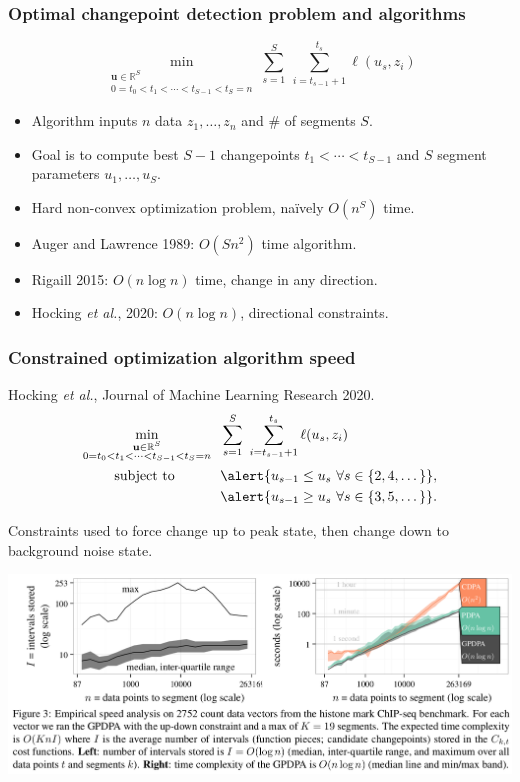 \documentclass{beamer}
\newcommand{\RR}{\mathbb R}
\begin{document}
\begin{frame}
  \frametitle{Optimal changepoint detection problem and algorithms}
  
  \vskip -1cm    
$$
\min_{\substack{
  \mathbf u\in\RR^{S}
\\
   0=t_0<t_1<\cdots<t_{S-1}<t_S=n
  }} 
    \sum_{s=1}^S\  \sum_{i=t_{s-1}+1}^{t_s} \ell( u_s,  z_i) 
$$
  \begin{itemize}
  \item Algorithm inputs $n$ data $z_1, \dots, z_n$ and \# of segments $S$.
  \item Goal is to compute best $S-1$ changepoints
    $t_1 < \cdots < t_{S-1}$ and $S$ segment parameters $u_1,\dots,u_S$.
  \item Hard non-convex optimization problem, na\" ively $O(n^S)$ time.
  \item Auger and Lawrence 1989: $O(Sn^2)$ time algorithm.
  \item Rigaill 2015: $O(n \log n)$ time, change in any direction.
  \item Hocking \emph{et al.}, 2020: $O(n \log n)$, directional constraints.
  \end{itemize}
\end{frame}

\begin{frame}
  \frametitle{Constrained optimization algorithm speed}
  Hocking {\it et al.}, Journal of Machine Learning Research 2020. 
\vskip -0.5cm
\begin{align*}
\min_{\substack{
  \mathbf u\in\RR^{S}
\\
   0=t_0<t_1<\cdots<t_{S-1}<t_S=n
}} & \ \
    \sum_{s=1}^S\  \sum_{i=t_{s-1}+1}^{t_s} \ell( u_s,  z_i) 
\\
      \text{subject to \hskip 0.8cm} &\ \ 
\alert{ u_{s-1} \leq u_s\ \forall s\in\{2,4,\dots\} },
  \nonumber\\
  &\ \ 
\alert{ u_{s-1} \geq u_s\ \forall s\in\{3,5,\dots\} }.
  \nonumber
\end{align*}

\alert{Constraints used to force change up to peak state, then change
  down to background noise state.}

\includegraphics[width=\textwidth]{screenshot-GPDPA-intervals}

\end{frame}
\end{document}
